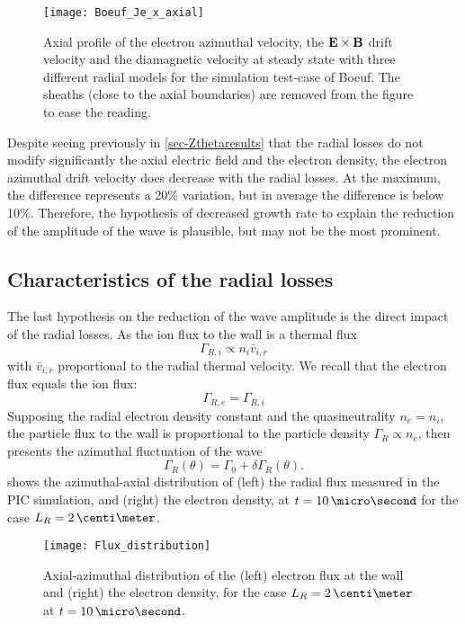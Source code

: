    
  \begin{figure}[hbt]
    \centering
    \texttt{[image: Boeuf\_Je\_x\_axial]}
    \caption{Axial profile of the electron azimuthal velocity, the ${\mathbf E} \times {\mathbf B}$ drift velocity and the diamagnetic velocity at steady state with three different radial models for the simulation test-case of Boeuf. The sheaths (close to the axial boundaries) are removed from the figure to ease the reading.}
    \label{fig-Jetheta}
  \end{figure}

  Despite seeing previously in \cref{sec-Zthetaresults} that the radial losses do not modify significantly the axial electric field and the electron density, the electron azimuthal drift velocity does decrease with the radial losses. 
  At the maximum, the difference represents a 20\% variation, but in average the difference is below 10\%.
  Therefore, the hypothesis of decreased growth rate to explain the reduction of the amplitude of the wave is plausible, but may not be the most prominent.

\FloatBarrier


\subsection{Characteristics of the radial losses}

  The last hypothesis on the reduction of the wave amplitude is the direct impact of the radial losses.
  As the ion flux to the wall is a thermal flux
  \[ \Gamma_{R, i} \propto n_i \bar{v}_{i, r} \]
  with $\bar{v}_{i, r}$ proportional to the radial thermal velocity.
  We recall that the electron flux equals the ion flux\string:
  \begin{equation} \label{eq-fluxequality}
   \Gamma_{R, e} = \Gamma_{R, i}
  \end{equation}
  Supposing the radial electron density constant and the quasineutrality $n_e=n_i$, the particle flux to the wall is proportional to the particle density $\Gamma_R \propto n_e$, then presents the azimuthal fluctuation of the wave
  \[ \Gamma_R(\theta) = \Gamma_0 + \delta \Gamma_R(\theta). \]
   shows the azimuthal-axial distribution of (left) the radial flux measured in the \ac{PIC} simulation, and (right) the electron density, at $t=10\,\micro\second$ for the case $L_R=2\,\centi\meter$.

  \begin{figure}[hbtp]
    \centering
    \texttt{[image: Flux\_distribution]}
    \caption{Axial-azimuthal distribution of the (left) electron flux at the wall and (right) the electron density, for the case $L_R=2\,\centi\meter$ at $t=10\,\micro\second$.}
    \label{fig-rfluxs}
  \end{figure}

